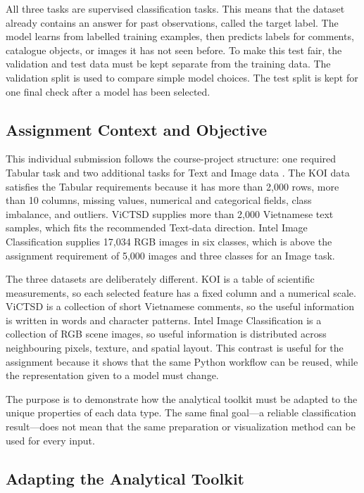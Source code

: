 \documentclass[oneside]{hcmut-report}
\begin{document}
All three tasks are supervised classification tasks. This means that the dataset already contains an answer for past observations, called the target label. The model learns from labelled training examples, then predicts labels for comments, catalogue objects, or images it has not seen before. To make this test fair, the validation and test data must be kept separate from the training data. The validation split is used to compare simple model choices. The test split is kept for one final check after a model has been selected.

\subsection*{Assignment Context and Objective}

This individual submission follows the course-project structure: one required Tabular task and two additional tasks for Text and Image data \cite{assignment-vne}. The KOI data satisfies the Tabular requirements because it has more than 2,000 rows, more than 10 columns, missing values, numerical and categorical fields, class imbalance, and outliers. ViCTSD supplies more than 2,000 Vietnamese text samples, which fits the recommended Text-data direction. Intel Image Classification supplies 17,034 RGB images in six classes, which is above the assignment requirement of 5,000 images and three classes for an Image task.

The three datasets are deliberately different. KOI is a table of scientific measurements, so each selected feature has a fixed column and a numerical scale. ViCTSD is a collection of short Vietnamese comments, so the useful information is written in words and character patterns. Intel Image Classification is a collection of RGB scene images, so useful information is distributed across neighbouring pixels, texture, and spatial layout. This contrast is useful for the assignment because it shows that the same Python workflow can be reused, while the representation given to a model must change.

The purpose is to demonstrate how the analytical toolkit must be adapted to the unique properties of each data type. The same final goal---a reliable classification result---does not mean that the same preparation or visualization method can be used for every input.

\subsection*{Adapting the Analytical Toolkit}
\end{document}
